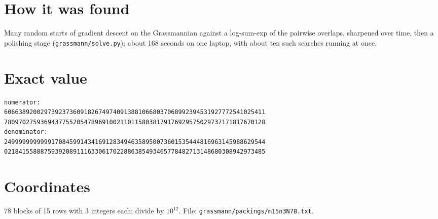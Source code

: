 \documentclass[11pt,a4paper]{article}
\begin{document}
\section{How it was found}
Many random starts of gradient descent on the Grassmannian against a log-sum-exp of the pairwise overlaps, sharpened over time, then a polishing stage (\texttt{grassmann/solve.py}); about 168 seconds on one laptop, with about ten such searches running at once.


\appendix
\section{Exact value}
{\small
\begin{verbatim}
numerator:
606638920029739237360918267497409138810668037068992394531927772541025411
780970275936943775520547896910021101158038179176929575029737171817670128
denominator:
249999999999917084599143416912834946358950073601535444816963145988629544
021841558887593920891116330617022886385493465778482713148680308942973485
\end{verbatim}}

\section{Coordinates}
78 blocks of 15 rows with 3 integers each; divide by $10^{12}$. File: \texttt{grassmann/packings/m15n3N78.txt}.
{\tiny
\begin{multicols}{3}
\end{multicols}}
\end{document}
